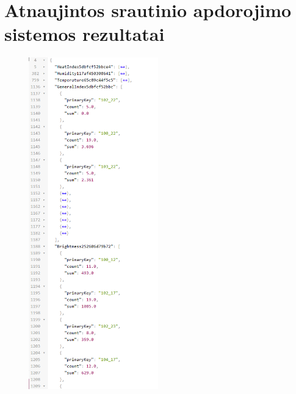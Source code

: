 \documentclass{VUMIFPSbakalaurinis}
\begin{document}
\section{Atnaujintos srautinio apdorojimo sistemos rezultatai}\label{add:generated-data2}
\begin{figure}[H]
    \centering
    \includegraphics[width=0.5\textwidth]{img/topology-data-2.png}
    \label{img:generated-data}
\end{figure}
\end{document}
